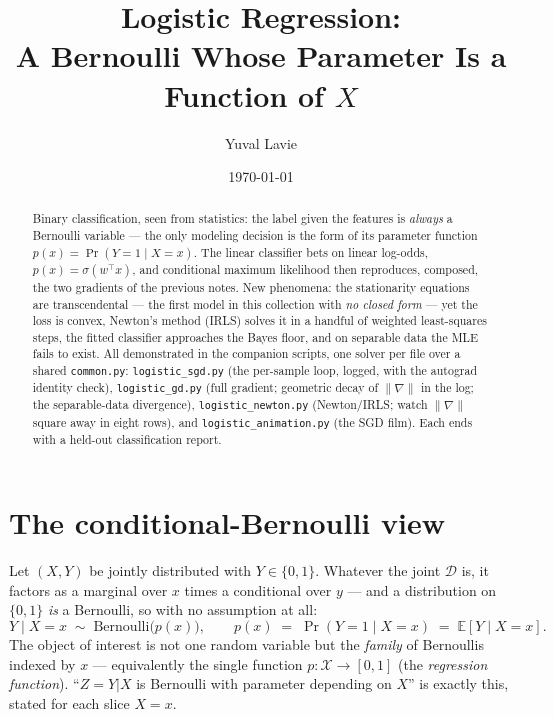 \documentclass[11pt]{article}
\title{Logistic Regression:\\
A Bernoulli Whose Parameter Is a Function of $X$}
\author{Yuval Lavie}
\date{\today}
\newcommand{\sig}{\sigma}
\newcommand{\D}{\mathcal{D}}
\begin{document}
\maketitle

\begin{abstract}
Binary classification, seen from statistics: the label given the features
is \emph{always} a Bernoulli variable --- the only modeling decision is
the form of its parameter function $p(x) = \Pr(Y{=}1 \mid X{=}x)$. The
linear classifier bets on linear log-odds, $p(x) = \sig(w^\top x)$, and
conditional maximum likelihood then reproduces, composed, the two
gradients of the previous notes. New phenomena: the stationarity
equations are transcendental --- the first model in this collection with
\emph{no closed form} --- yet the loss is convex, Newton's method (IRLS)
solves it in a handful of weighted least-squares steps, the fitted
classifier approaches the Bayes floor, and on separable data the MLE
fails to exist. All demonstrated in the companion scripts, one solver
per file over a shared \texttt{common.py}: \texttt{logistic\_sgd.py}
(the per-sample loop, logged, with the autograd identity check),
\texttt{logistic\_gd.py} (full gradient; geometric decay of
$\|\nabla\|$ in the log; the separable-data divergence),
\texttt{logistic\_newton.py} (Newton/IRLS; watch $\|\nabla\|$ square
away in eight rows), and \texttt{logistic\_animation.py} (the SGD
film). Each ends with a held-out classification report.
\end{abstract}

\section{The conditional-Bernoulli view}

Let $(X, Y)$ be jointly distributed with $Y \in \{0,1\}$. Whatever the
joint $\D$ is, it factors as a marginal over $x$ times a conditional over
$y$ --- and a distribution on $\{0,1\}$ \emph{is} a Bernoulli, so with no
assumption at all:
\begin{equation}
  Y \mid X = x \;\sim\; \mathrm{Bernoulli}\bigl(p(x)\bigr),
  \qquad
  p(x) \;=\; \Pr(Y=1 \mid X=x) \;=\; \mathbb{E}[Y \mid X=x].
  \label{eq:condbern}
\end{equation}
The object of interest is not one random variable but the \emph{family}
of Bernoullis indexed by $x$ --- equivalently the single function
$p:\mathcal{X}\to[0,1]$ (the \emph{regression function}). ``$Z = Y|X$ is
Bernoulli with parameter depending on $X$'' is exactly this, stated for
each slice $X = x$.
\end{document}
